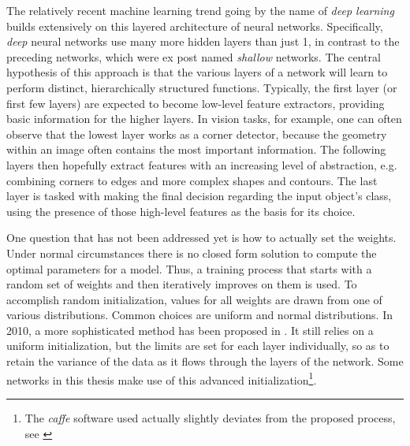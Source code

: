 \documentclass[11pt, a4paper]{article}
\begin{document}
The relatively recent machine learning trend going by the name of \emph{deep learning} builds extensively on this layered architecture of neural networks. Specifically, \emph{deep} neural networks use many more hidden layers than just 1, in contrast to the preceding networks, which were ex post named \emph{shallow} networks. The central hypothesis of this approach is that the various layers of a network will learn to perform distinct, hierarchically structured functions. Typically, the first layer (or first few layers) are expected to become low-level feature extractors, providing basic information for the higher layers. In vision tasks, for example, one can often observe that the lowest layer works as a corner detector, because the geometry within an image often contains the most important information. The following layers then hopefully extract features with an increasing level of abstraction, e.g. combining corners to edges and more complex shapes and contours. The last layer is tasked with making the final decision regarding the input object's class, using the presence of those high-level features as the basis for its choice.

One question that has not been addressed yet is how to actually set the weights. Under normal circumstances there is no closed form solution to compute the optimal parameters for a model. Thus, a training process that starts with a random set of weights and then iteratively improves on them is used. To accomplish random initialization, values for all weights are drawn from one of various distributions. Common choices are uniform and normal distributions. In 2010, a more sophisticated method has been proposed in \cite{glorot-understanding-deep-nn-training}. It still relies on a uniform initialization, but the limits are set for each layer individually, so as to retain the variance of the data as it flows through the layers of the network. Some networks in this thesis make use of this advanced initialization\footnote{The \emph{caffe} software used actually slightly deviates from the proposed process, see \cite{caffe-xavier}}.
\end{document}
